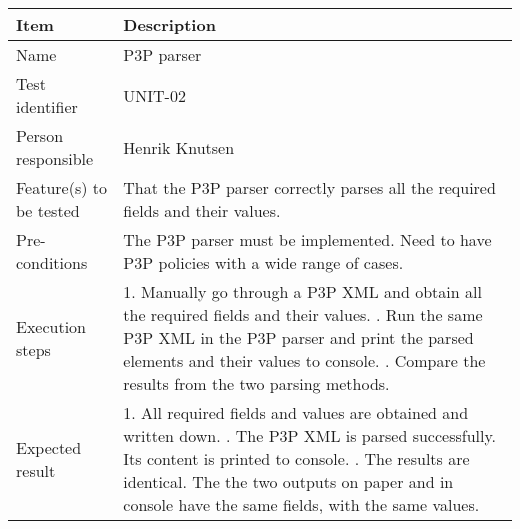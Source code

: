 \documentclass[12pt, fullpage, oneside]{report}
\begin{document}
		\begin{center}
			\begin{tabular}{ |  p{3.5cm} | p{10cm} | }
				\hline
				Item & Description \\ [5pt] \hline \hline
				Name & P3P parser \\  [5pt] \hline
				Test identifier & UNIT-02 \\  [5pt] \hline
				Person responsible & Henrik Knutsen \\  [5pt] \hline
				Feature(s) to be tested & That the P3P parser correctly parses all the required fields and their values. \\  [5pt] \hline
				Pre-conditions & The P3P parser must be implemented. Need to have P3P policies with a wide range of cases. \\  [5pt] \hline
				Execution steps & 1. Manually go through a P3P XML and obtain all the required fields and their values. \newline 2. Run the same P3P XML in the P3P parser and print the parsed elements and their values to console.
					\newline 3. Compare the results from the two parsing methods. \\  [5pt] \hline
				Expected result & 1. All required fields and values are obtained and written down. \newline 2. The P3P XML is parsed successfully. Its content is printed to console. \newline 3. The results are identical. The the two outputs on paper and in console have the same fields, 						with the same values. \\  [5pt] \hline
			\end{tabular}
		\end{center}
		
\end{document}
